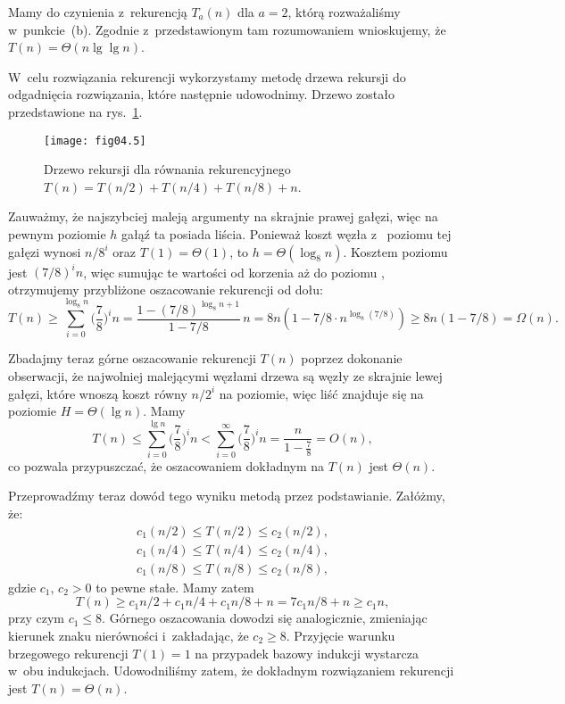 \subproblem %
Mamy do czynienia z~rekurencją $T_a(n)$ dla $a=2$, którą rozważaliśmy w~punkcie~(b). Zgodnie z~przedstawionym tam rozumowaniem wnioskujemy, że $T(n)=\Theta(n\lg\lg n)$.

\subproblem %
W~celu rozwiązania rekurencji wykorzystamy metodę drzewa rekursji do odgadnięcia rozwiązania, które następnie udowodnimy. Drzewo zostało przedstawione na rys.~\ref{fig:4-4f}.
\begin{figure}[ht]
	\begin{center}
		\texttt{[image: fig04.5]}
	\end{center}
	\caption{Drzewo rekursji dla równania rekurencyjnego $T(n)=T(n/2)+T(n/4)+T(n/8)+n$.} \label{fig:4-4f}
\end{figure}

Zauważmy, że najszybciej maleją argumenty na skrajnie prawej gałęzi, więc na pewnym poziomie $h$ gałąź ta posiada liścia. Ponieważ koszt węzła z~ poziomu tej gałęzi wynosi $n/8^i$ oraz $T(1)=\Theta(1)$, to $h=\Theta(\log_8n)$. Kosztem  poziomu jest $(7/8)^in$, więc sumując te wartości od korzenia aż do poziomu , otrzymujemy przybliżone oszacowanie rekurencji od dołu:
\[
	T(n) \ge \sum_{i=0}^{\log_8n}\biggl(\frac{7}{8}\biggr)^in = \frac{1-(7/8)^{\log_8n+1}}{1-7/8}\,n = 8n(1-7/8\cdot n^{\log_8(7/8)}) \ge 8n(1-7/8) = \Omega(n).
\]

Zbadajmy teraz górne oszacowanie rekurencji $T(n)$ poprzez dokonanie obserwacji, że najwolniej malejącymi węzłami drzewa są węzły ze skrajnie lewej gałęzi, które wnoszą koszt równy $n/2^i$ na  poziomie, więc liść znajduje się na poziomie $H=\Theta(\lg n)$. Mamy
\[
	T(n) \le \sum_{i=0}^{\lg n}\biggl(\frac{7}{8}\biggr)^in < \sum_{i=0}^\infty\biggl(\frac{7}{8}\biggr)^in = \frac{n}{1-\frac{7}{8}} = O(n),
\]
co pozwala przypuszczać, że oszacowaniem dokładnym na $T(n)$ jest $\Theta(n)$.

Przeprowadźmy teraz dowód tego wyniku metodą przez podstawianie. Załóżmy, że:
\begin{gather*}
	c_1(n/2) \le T(n/2) \le c_2(n/2), \\
	c_1(n/4) \le T(n/4) \le c_2(n/4), \\
	c_1(n/8) \le T(n/8) \le c_2(n/8),
\end{gather*}
gdzie $c_1$, $c_2>0$ to pewne stałe. Mamy zatem
\[
	T(n) \ge c_1n/2+c_1n/4+c_1n/8+n = 7c_1n/8+n \ge c_1n,
\]
przy czym $c_1\le8$. Górnego oszacowania dowodzi się analogicznie, zmieniając kierunek znaku nierówności i~zakładając, że $c_2\ge8$. Przyjęcie warunku brzegowego rekurencji $T(1)=1$ na przypadek bazowy indukcji wystarcza w~obu indukcjach. Udowodniliśmy zatem, że dokładnym rozwiązaniem rekurencji jest $T(n)=\Theta(n)$.

